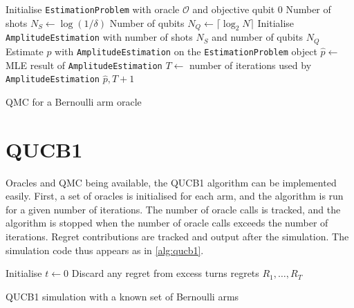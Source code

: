 \begin{algorithm}
    \SetAlgoLined
    Initialise \texttt{EstimationProblem} with oracle $\mathcal{O}$ and objective qubit 0 \;
    Number of shots $N_S \leftarrow \log(1 / \delta)$ \;
    Number of qubits $N_Q \leftarrow \lceil \log_2 N \rceil$ \;
    Initialise \texttt{AmplitudeEstimation} with number of shots $N_S$ and number of qubits $N_Q$ \;
    Estimate $p$ with \texttt{AmplitudeEstimation} on the \texttt{EstimationProblem} object \;
    $\hat{p} \leftarrow$ MLE result of \texttt{AmplitudeEstimation} \;
    $T \leftarrow$ number of iterations used by \texttt{AmplitudeEstimation} \;
    \Return $\hat{p}, T + 1$
    \caption{QMC for a Bernoulli arm oracle}
    \label{alg:qucb_qmc}
\end{algorithm}

\section{QUCB1}
Oracles and QMC being available, the QUCB1 algorithm can be implemented easily.
First, a set of oracles is initialised for each arm, and the algorithm is run for a given number of iterations.
The number of oracle calls is tracked, and the algorithm is stopped when the number of oracle calls exceeds the number of iterations.
Regret contributions are tracked and output after the simulation.
The simulation code thus appears as in \cref{alg:qucb1}.

\begin{algorithm}
    \SetAlgoLined
    Initialise $t \leftarrow 0$ \;
    Discard any regret from excess turns \;
    \Return regrets $R_1, \ldots, R_T$
    \caption{QUCB1 simulation with a known set of Bernoulli arms}
    \label{alg:qucb1_sim}
\end{algorithm}
